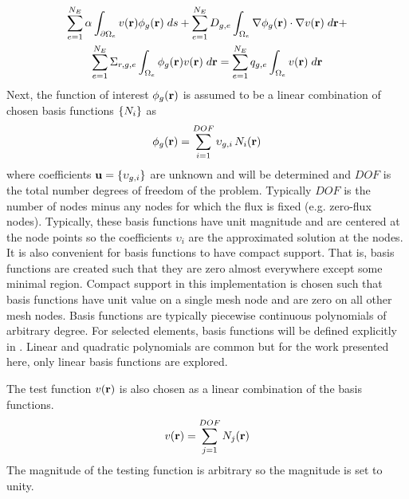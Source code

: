     \begin{multline}
      \label{eq:element_boundary}
      \sum_{e=1}^{N_E} \alpha \int_{\partial \Omega_e} v(\mathbf{r}) 
        \phi_g(\mathbf{r}) \;ds + \sum_{e=1}^{N_E} D_{g,e}
        \int_{\Omega_e} \mathbf{\nabla} \phi_g(\mathbf{r}) \cdot \mathbf{\nabla} v(\mathbf{r}) \; d\mathbf{r} + \\
        \sum_{e=1}^{N_E} \Sigma_{r,g,e} \int_{\Omega_e} \phi_g(\mathbf{r}) v(\mathbf{r}) 
        \; d\mathbf{r} =
        \sum_{e=1}^{N_E} q_{g,e} \int_{\Omega_e} v(\mathbf{r}) \; d\mathbf{r}
    \end{multline}
    Next, the function of interest $\phi_g(\mathbf{r})$ is assumed to be a linear 
    combination of chosen basis functions $\{N_i\}$ as
    \begin{equation} 
      \label{eq:linear_combination}
      \phi_g(\mathbf{r}) = \sum_{i=1}^{DOF} \upsilon_{g,i} \, N_i(\mathbf{r})
    \end{equation}
    where coefficients $\mathbf{u} = \{\upsilon_{g,i}\}$ are unknown and will be 
    determined and $DOF$ is the total number degrees of freedom of the problem. 
    Typically $DOF$ is the number of nodes minus any nodes for which the flux is 
    fixed (e.g. zero-flux nodes). Typically, these basis functions have unit 
    magnitude and are centered at the node  points so the coefficients 
    $\upsilon_i$ are the approximated solution at the nodes. It is also 
    convenient for basis functions to have compact support. That is, basis 
    functions are created such that they are zero almost everywhere except some
    minimal region. Compact support in this implementation is chosen such that
    basis functions have unit value on a single mesh node and are zero on all
    other mesh nodes. Basis functions are typically piecewise continuous 
    polynomials of arbitrary degree. For selected elements, basis functions will
    be defined explicitly in . Linear and quadratic
    polynomials are common but for the work presented here, only linear
    basis functions are explored.

    The test function $v(\mathbf{r})$ is also chosen as a linear combination of the 
    basis functions.
    \begin{equation} 
      \label{eq:linear_superposition}
      v(\mathbf{r}) = \sum_{j=1}^{DOF} N_j(\mathbf{r})
    \end{equation}
    The magnitude of the testing function is arbitrary so the magnitude is set
    to unity.
    
